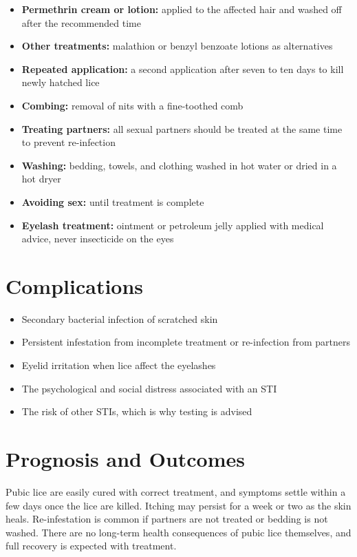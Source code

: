 \begin{itemize}
    \item \textbf{Permethrin cream or lotion:} applied to the affected hair and washed off after the recommended time
    \item \textbf{Other treatments:} malathion or benzyl benzoate lotions as alternatives
    \item \textbf{Repeated application:} a second application after seven to ten days to kill newly hatched lice
    \item \textbf{Combing:} removal of nits with a fine-toothed comb
    \item \textbf{Treating partners:} all sexual partners should be treated at the same time to prevent re-infection
    \item \textbf{Washing:} bedding, towels, and clothing washed in hot water or dried in a hot dryer
    \item \textbf{Avoiding sex:} until treatment is complete
    \item \textbf{Eyelash treatment:} ointment or petroleum jelly applied with medical advice, never insecticide on the eyes
\end{itemize}

\section*{Complications}
\begin{itemize}
    \item Secondary bacterial infection of scratched skin
    \item Persistent infestation from incomplete treatment or re-infection from partners
    \item Eyelid irritation when lice affect the eyelashes
    \item The psychological and social distress associated with an STI
    \item The risk of other STIs, which is why testing is advised
\end{itemize}

\section*{Prognosis and Outcomes}
Pubic lice are easily cured with correct treatment, and symptoms settle within a few days once the lice are killed. Itching may persist for a week or two as the skin heals. Re-infestation is common if partners are not treated or bedding is not washed. There are no long-term health consequences of pubic lice themselves, and full recovery is expected with treatment.

